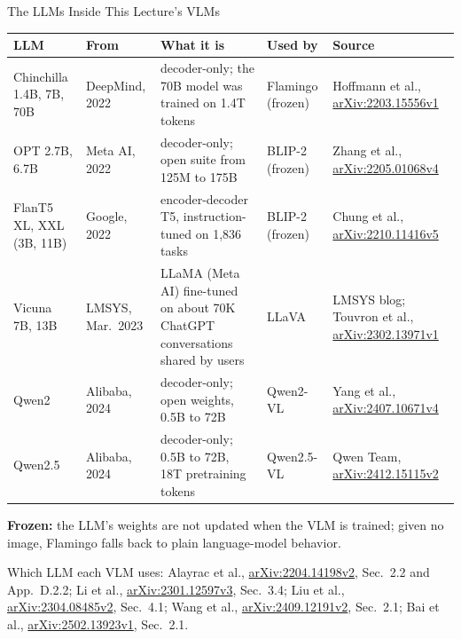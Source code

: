 \begin{frame}{The LLMs Inside This Lecture's VLMs}

  {\centering\scriptsize\setlength{\tabcolsep}{3pt}
  \begin{tabular}{>{\raggedright\arraybackslash}p{2.1cm} >{\raggedright\arraybackslash}p{1.6cm} >{\raggedright\arraybackslash}p{4.2cm} >{\raggedright\arraybackslash}p{1.9cm} >{\raggedright\arraybackslash}p{2.6cm}}
    \toprule
    \textbf{LLM} & \textbf{From} & \textbf{What it is} & \textbf{Used by} & \textbf{Source} \\
    \midrule
    Chinchilla 1.4B, 7B, 70B & DeepMind, 2022 & decoder-only; the 70B model was trained on 1.4T tokens & Flamingo (frozen) & Hoffmann et al., \href{https://arxiv.org/abs/2203.15556v1}{arXiv:2203.15556v1} \\
    \addlinespace[0.15em]
    OPT 2.7B, 6.7B & Meta AI, 2022 & decoder-only; open suite from 125M to 175B & BLIP-2 (frozen) & Zhang et al., \href{https://arxiv.org/abs/2205.01068v4}{arXiv:2205.01068v4} \\
    \addlinespace[0.15em]
    FlanT5 XL, XXL (3B, 11B) & Google, 2022 & encoder-decoder T5, instruction-tuned on 1,836 tasks & BLIP-2 (frozen) & Chung et al., \href{https://arxiv.org/abs/2210.11416v5}{arXiv:2210.11416v5} \\
    \addlinespace[0.15em]
    Vicuna 7B, 13B & LMSYS, Mar.\ 2023 & LLaMA (Meta AI) fine-tuned on about 70K ChatGPT conversations shared by users & LLaVA & LMSYS blog; Touvron et al., \href{https://arxiv.org/abs/2302.13971v1}{arXiv:2302.13971v1} \\
    \addlinespace[0.15em]
    Qwen2 & Alibaba, 2024 & decoder-only; open weights, 0.5B to 72B & Qwen2-VL & Yang et al., \href{https://arxiv.org/abs/2407.10671v4}{arXiv:2407.10671v4} \\
    \addlinespace[0.15em]
    Qwen2.5 & Alibaba, 2024 & decoder-only; 0.5B to 72B, 18T pretraining tokens & Qwen2.5-VL & Qwen Team, \href{https://arxiv.org/abs/2412.15115v2}{arXiv:2412.15115v2} \\
    \bottomrule
  \end{tabular}\par}
  \vspace{0.4em}
  {\footnotesize \textbf{Frozen:} the LLM's weights are not updated when the VLM is trained; given no image, Flamingo falls back to plain language-model behavior.\par}
  \vspace{0.3em}
  {\scriptsize Which LLM each VLM uses: Alayrac et al., \href{https://arxiv.org/abs/2204.14198v2}{arXiv:2204.14198v2}, Sec.~2.2 and App.~D.2.2; Li et al., \href{https://arxiv.org/abs/2301.12597v3}{arXiv:2301.12597v3}, Sec.~3.4; Liu et al., \href{https://arxiv.org/abs/2304.08485v2}{arXiv:2304.08485v2}, Sec.~4.1; Wang et al., \href{https://arxiv.org/abs/2409.12191v2}{arXiv:2409.12191v2}, Sec.~2.1; Bai et al., \href{https://arxiv.org/abs/2502.13923v1}{arXiv:2502.13923v1}, Sec.~2.1.\par}
\end{frame}

